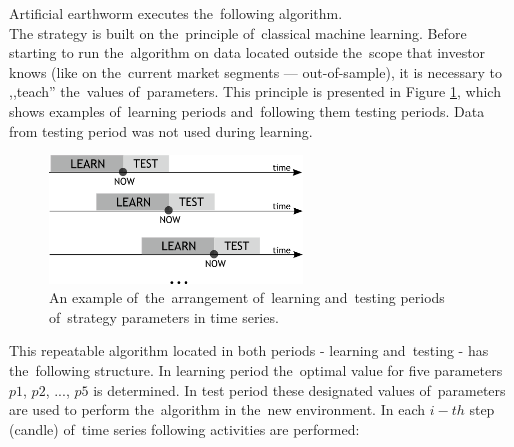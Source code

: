 \documentclass[runningheads,a4paper]{llncs}
\begin{document}
Artificial earthworm executes the~following algorithm.\\
The strategy is built on the~principle of~classical machine learning. Before starting to run the~algorithm on data located outside the~scope that investor knows (like on the~current market segments --- out-of-sample), it is necessary to ,,teach''  the~values of~parameters. This principle is presented in Figure \ref{fig:fig2}, which shows examples of~learning periods and~following them testing periods. Data from testing period was not used during learning.\\
\begin{figure}[ht]
\centering
\includegraphics[width = 0.6\textwidth]{figures/rys2.png}
\caption{An example of~the~arrangement of~learning and~testing periods of~strategy parameters in time series.}
\label{fig:fig2}
\end{figure}
\FloatBarrier
\vspace{-1em}
This repeatable algorithm located in both periods - learning and~testing - has the~following structure. In learning period the~optimal value for five parameters $p1$, $p2$, ..., $p5$ is determined. In test period these designated values of~parameters are used to perform the~algorithm in the~new environment. In each $i-th$ step (candle) of~time series following activities are performed:
\end{document}
